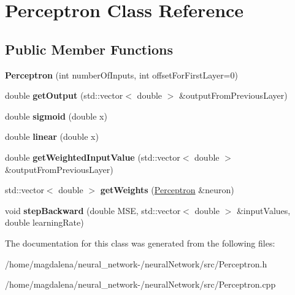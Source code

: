 \hypertarget{classPerceptron}{}\section{Perceptron Class Reference}
\label{classPerceptron}
\subsection*{Public Member Functions}
\begin{DoxyCompactItemize}
\item 
\mbox{\label{classPerceptron_a1d0126d97a8ffa9e67780a22614dd70e}} 
{\bfseries Perceptron} (int number\+Of\+Inputs, int offset\+For\+First\+Layer=0)
\item 
\mbox{\label{classPerceptron_aa8481928b23d4c1193fe9a5be8be4f34}} 
double {\bfseries get\+Output} (std\+::vector$<$ double $>$ \&output\+From\+Previous\+Layer)
\item 
\mbox{\label{classPerceptron_ab892c5f786ef0adc50a1c67714176ec6}} 
double {\bfseries sigmoid} (double x)
\item 
\mbox{\label{classPerceptron_ab875e1c9a1c95567679ac0cc8b8e2387}} 
double {\bfseries linear} (double x)
\item 
\mbox{\label{classPerceptron_a354a430917bbd8616231952690a4a542}} 
double {\bfseries get\+Weighted\+Input\+Value} (std\+::vector$<$ double $>$ \&output\+From\+Previous\+Layer)
\item 
\mbox{\label{classPerceptron_a1be285519597daa4471b18f634f4c543}} 
std\+::vector$<$ double $>$ {\bfseries get\+Weights} (\hyperlink{classPerceptron}{Perceptron} \&neuron)
\item 
\mbox{\label{classPerceptron_ac3ec883408c075c35205a6d85f942ceb}} 
void {\bfseries step\+Backward} (double M\+SE, std\+::vector$<$ double $>$ \&input\+Values, double learning\+Rate)
\end{DoxyCompactItemize}


The documentation for this class was generated from the following files\+:\begin{DoxyCompactItemize}
\item 
/home/magdalena/neural\+\_\+network-\//neural\+Network/src/Perceptron.\+h\item 
/home/magdalena/neural\+\_\+network-\//neural\+Network/src/Perceptron.\+cpp\end{DoxyCompactItemize}
